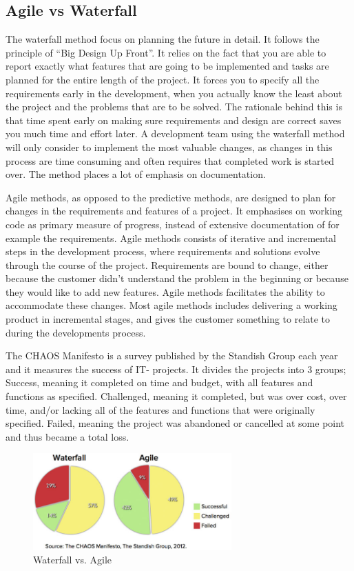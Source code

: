 \subsection{Agile vs Waterfall}
The waterfall method focus on planning the future in detail. It follows the principle of “Big Design Up Front”. It relies on the fact that you are able to report exactly what features that are going to be implemented and tasks are planned for the entire length of the project. It forces you to specify all the requirements early in the development, when you actually know the least about the project and the problems that are to be solved. The rationale behind this is that time spent early on making sure requirements and design are correct saves you much time and effort later. A development team using the waterfall method will only consider to implement the most valuable changes, as changes in this process are time consuming and often requires that completed work is started over. The method places a lot of emphasis on documentation. 

Agile methods, as opposed to the predictive methods, are designed to plan for changes in the requirements and features of a project. It emphasises on working code as primary measure of progress, instead of extensive documentation of for example the requirements. Agile methods consists of iterative and incremental steps in the development process, where requirements and solutions evolve through the course of the project. Requirements are bound to change, either because the customer didn't understand the problem in the beginning or because they would like to add new features. Agile methods facilitates the ability to accommodate these changes. Most agile methods includes delivering a working product in incremental stages, and gives the customer something to relate to during the developments process.

The CHAOS Manifesto is a survey published by the Standish Group each year and it measures the success of IT- projects. It divides the projects into 3 groups; Success, meaning it completed on time and budget, with all features and functions as specified. Challenged, meaning it  completed, but was over cost, over time, and/or lacking all of the features and functions that were originally specified. Failed, meaning the project was abandoned or cancelled at some point and thus became a total loss.

\begin{figure}
\centering
\includegraphics[width=3in]{image/Agile-Waterfall.jpeg}
\caption{Waterfall vs. Agile}
\label{figure:devchart}
\end{figure}


